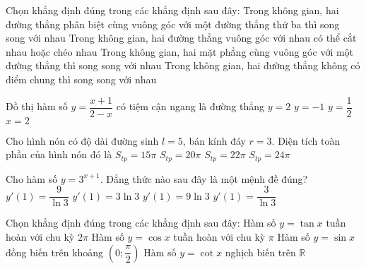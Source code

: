 \begin{ex}%
	Chọn khẳng định đúng trong các khẳng định sau đây:
	\choice
	{Trong không gian, hai đường thẳng phân biệt cùng vuông góc với một đường thẳng thứ ba thì song song với nhau}
	{\True Trong không gian, hai đường thẳng vuông góc với nhau có thể cắt nhau hoặc chéo nhau}
	{Trong không gian, hai mặt phẳng cùng vuông góc với một đường thẳng thì song song với nhau}
	{Trong không gian, hai đường thẳng không có điểm chung thì song song với nhau}
\end{ex}
\begin{ex}%
	Đồ thị hàm số $y=\dfrac{x+1}{2-x}$ có tiệm cận ngang là đường thẳng
	\choice
	{$y=2$}
	{\True $y=-1$}
	{$y=\dfrac{1}{2}$}
	{$x=2$}
\end{ex}
\begin{ex}%
	Cho hình nón có độ dài đường sinh $l=5$, bán kính đáy $r=3$. Diện tích toàn phần của hình nón đó là
	\choice
	{$S_{tp}=15\pi $}
	{$S_{tp}=20\pi $}
	{$S_{tp}=22\pi $}
	{\True $S_{tp}=24\pi $}
\end{ex}
\begin{ex}%
	Cho hàm số $y=3^{x+1}$. Đẳng thức nào sau đây là một mệnh đề đúng?
	\choice
	{$y'(1)=\dfrac{9}{\ln 3}$}
	{$y'(1)=3\ln 3$}
	{\True $y'(1)=9\ln 3$}
	{$y'(1)=\dfrac{3}{\ln 3}$}
\end{ex}
\begin{ex}%
	Chọn khẳng định đúng trong các khẳng định sau đây:
	\choice
	{Hàm số $y=\tan x$ tuần hoàn với chu kỳ $2\pi $}
	{Hàm số $y=\cos x$ tuần hoàn với chu kỳ $\pi $}
	{\True Hàm số $y=\sin x$ đồng biến trên khoảng $\left(0;\dfrac{\pi}{2}\right)$}
	{Hàm số $y=\cot x$ nghịch biến trên $\mathbb{R}$}
\end{ex}
